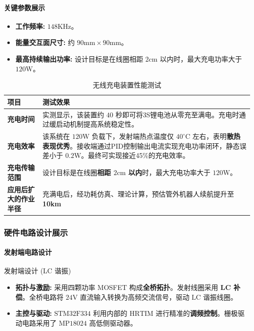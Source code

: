 \documentclass[12pt, a4paper]{article}
\begin{document}
\paragraph{关键参数展示}

\begin{itemize}
    \item \textbf{工作频率:} $148\text{KHz}$。
    \item \textbf{能量交互面尺寸:} 约 $90\text{mm} \times 90\text{mm}$。
    \item \textbf{最高持续输出功率:} 设计目标是在线圈相距 $2\text{cm}$ 以内时，最大充电功率大于 $120\text{W}$。
\end{itemize}

\begin{table}[htbp]
\centering
\caption{无线充电装置性能测试}
\begin{tabular}{p{}p{}}
\toprule
\textbf{项目} & \textbf{测试效果} \\
\midrule
\textbf{充电时间} & 实测显示，该装置约 $40$ 秒即可将3S锂电池从零充至满电。充电时通过缓启动机制提高系统稳定性。 \\
\textbf{充电效率} & 该系统在 $120\text{W}$ 负载下，发射端热点温度仅 $40^\circ\text{C}$ 左右，表明\textbf{散热表现优秀}。接收端通过PID控制输出电流实现充电功率闭环，静态误差小于 $0.2\text{W}$。最终可实现接近45\%的充电效率。 \\
\textbf{充电传输范围} & 设计目标是在线圈\textbf{相距 $2\text{cm}$ 以内}时，最大充电功率大于 $120\text{W}$。 \\
\textbf{应用后扩大的作业半径} & 充满电后，经功耗仿真、理论计算，预估管外机器人续航提升至\textbf{10km} \\
\bottomrule
\end{tabular}
\end{table}

\subsubsection{硬件电路设计展示}

\paragraph{发射端电路设计}

发射端设计 (LC 谐振)

\begin{itemize}
    \item \textbf{拓扑与激励:} 采用四颗功率 MOSFET 构成\textbf{全桥拓扑}。发射线圈采用 \textbf{LC 补偿}。全桥电路将 $24\text{V}$ 直流输入转换为高频交流信号，驱动 $\text{LC}$ 谐振线圈。
    \item \textbf{主控与驱动:} $\text{STM}32\text{F}334$ 利用内部的 $\text{HRTIM}$ 进行精准的\textbf{调频控制}。栅极驱动电路采用了 $\text{MP}18024$ 高低侧驱动器。
\end{itemize}
\end{document}
